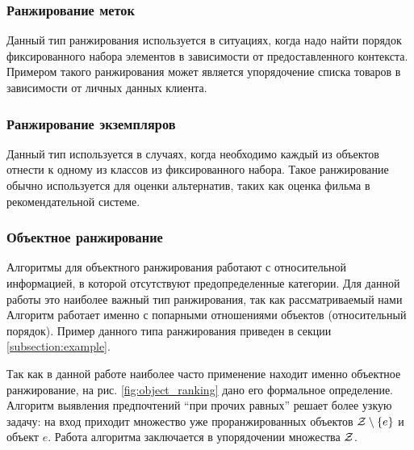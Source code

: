 	\subsubsection{Ранжирование меток}
		Данный тип ранжирования используется в ситуациях, когда надо найти порядок фиксированного набора элементов в зависимости от предоставленного контекста. Примером такого ранжирования может является упорядочение списка товаров в зависимости от личных данных клиента.
	
	\subsubsection{Ранжирование экземпляров}
		Данный тип используется в случаях, когда необходимо каждый из объектов отнести к одному из классов из фиксированного набора. Такое ранжирование обычно используется для оценки альтернатив, таких как оценка фильма в рекомендательной системе.
	
	\subsubsection{Объектное ранжирование}
		Алгоритмы для объектного ранжирования работают с 
		относительной %
		информацией, в которой отсутствуют предопределенные категории. Для данной работы это наиболее важный тип ранжирования, так как рассматриваемый нами Алгоритм работает именно с попарными отношениями объектов (относительный порядок). Пример данного типа ранжирования приведен в секции \ref{subsection:example}.
		
		Так как в данной работе наиболее часто применение находит именно объектное ранжирование, на рис. \ref{fig:object_ranking} дано его формальное определение. Алгоритм выявления предпочтений \enquote{при прочих равных} решает более узкую задачу: на вход приходит множество уже проранжированных объектов $\mathcal{Z} \setminus \{e\}$ и объект $e$. Работа алгоритма заключается в упорядочении множества $\mathcal{Z}$.
		
